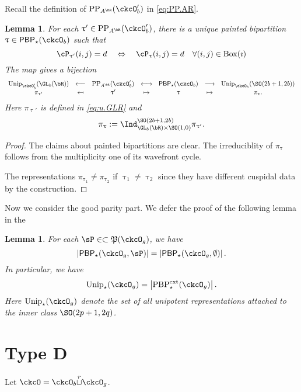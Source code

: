 \documentclass[12pt,a4paper]{amsart}
\def\abs#1{\left|{#1}\right|}
\numberwithin{equation}{section}
\newtheorem{lem}[thm]{Lemma}
\theoremstyle{remark}
\def\Unip{\mathrm{Unip}}
\def\PP{\mathrm{PP}}
\def\BOX#1{\mathrm{Box}(#1)}
\providecommand\mapsfrom{\scalebox{-1}[1]{$\mapsto$}}
\def\cuprow{{\stackrel{r}{\sqcup}}}
\def\CPP{\mathfrak{P}}
\def\PBPes{\mathrm{PBP}^{\mathrm{ext}}_{\star}}
\begin{document}
Recall the definition of $\PP_{A^{\bR}}(\ckcO'_{b})$ in  \eqref{eq:PP.AR}.

\begin{lem}
  For each $\uptau' \in \PP_{A^{\bR}}(\ckcO'_{b})$, there is a unique painted
  bipartition $\uptau\in \PBP_{\star}(\ckcO_{b})$ such that
  \[
    \cP_{\uptau'}(i,j) = d \quad %
    \Leftrightarrow
    \quad
    \cP_{\uptau}(i,j) = d \quad \forall (i,j)\in \BOX{\imath}\\
  \]
  The map gives a bijection
  \[
    \begin{array}{ccccccc}
      \Unip_{\ckcO'_{b}}(\GL_{b}(\bR))&\longleftarrow
      &\PP_{A^{\bR}}(\ckcO'_{b}) & \longleftrightarrow
      & \PBP_{\star}(\ckcO_{b}) & \longrightarrow
      & \Unip_{\ckcO_{b}}(\SO(2b+1,2b))\\
      \pi_{\uptau'} & \mapsfrom & \uptau' & \mapsto
      & \uptau & \mapsto & \pi_{\uptau}.
    \end{array}
  \]
  Here $\pi_{\uptau'}$ is defined in \eqref{eq:u.GLR} and
  \[
    \pi_{\uptau} := \Ind_{\GL_{b}(\bR)\times \SO(1,0)}^{\SO(2b+1,2b)} \pi_{\uptau'}.
  \]
\end{lem}
\begin{proof}
  The claims about painted bipartitions are clear.
  The irreduciblity of $\pi_{\uptau}$ follows from the multiplicity one
  of its wavefront cycle.

  The representations $\pi_{\uptau_{1}}\neq \pi_{\uptau_{2}}$ if
  $\uptau_{1}\neq \uptau_{2}$ since they have different cuspidal data by the
  construction.
\end{proof}

Now we consider the good parity part. We defer the proof of the following lemma
in the 

\begin{lem}
  For each $\sP\in \subset \CPP(\ckcO_{g})$,
  we have
  \[
    \abs{\PBP_{\star}(\ckcO_{g},\sP)} =
    \abs{\PBP_{\star}(\ckcO_{g},\emptyset)}.
  \]
  In particular, we have
  \[
    \Unip_{\star}(\ckcO_{g}) = \abs{\PBPes(\ckcO_{g})}.
  \]
  Here $\Unip_{\star}(\ckcO_{g})$ denote the set of all unipotent
  representations attached to the inner class $\SO(2p+1,2q)$.
\end{lem}


\section{Type D}


Let $\ckcO = \ckcO_{b}\cuprow \ckcO_{g}$.
\end{document}
